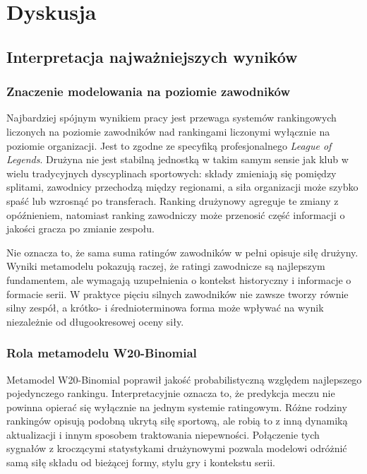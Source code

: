 \chapter{Dyskusja}

\section{Interpretacja najważniejszych wyników}

\subsection{Znaczenie modelowania na poziomie zawodników}

Najbardziej spójnym wynikiem pracy jest przewaga systemów rankingowych liczonych na poziomie zawodników nad rankingami liczonymi wyłącznie na poziomie organizacji. Jest to zgodne ze specyfiką profesjonalnego \textit{League of Legends}. Drużyna nie jest stabilną jednostką w takim samym sensie jak klub w wielu tradycyjnych dyscyplinach sportowych: składy zmieniają się pomiędzy splitami, zawodnicy przechodzą między regionami, a siła organizacji może szybko spaść lub wzrosnąć po transferach. Ranking drużynowy agreguje te zmiany z opóźnieniem, natomiast ranking zawodniczy może przenosić część informacji o jakości gracza po zmianie zespołu.

Nie oznacza to, że sama suma ratingów zawodników w pełni opisuje siłę drużyny. Wyniki metamodelu pokazują raczej, że ratingi zawodnicze są najlepszym fundamentem, ale wymagają uzupełnienia o kontekst historyczny i informacje o formacie serii. W praktyce pięciu silnych zawodników nie zawsze tworzy równie silny zespół, a krótko- i średnioterminowa forma może wpływać na wynik niezależnie od długookresowej oceny siły.

\subsection{Rola metamodelu W20-Binomial}

Metamodel W20-Binomial poprawił jakość probabilistyczną względem najlepszego pojedynczego rankingu. Interpretacyjnie oznacza to, że predykcja meczu nie powinna opierać się wyłącznie na jednym systemie ratingowym. Różne rodziny rankingów opisują podobną ukrytą siłę sportową, ale robią to z inną dynamiką aktualizacji i innym sposobem traktowania niepewności. Połączenie tych sygnałów z kroczącymi statystykami drużynowymi pozwala modelowi odróżnić samą siłę składu od bieżącej formy, stylu gry i kontekstu serii.

